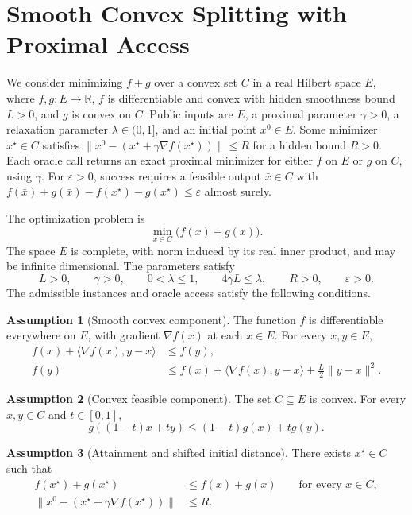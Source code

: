 \documentclass[10pt]{article}
\theoremstyle{definition}
\newtheorem{assumption}{Assumption}
\begin{document}
\section*{Smooth Convex Splitting with Proximal Access}
We consider minimizing $f+g$ over a convex set $C$ in a real Hilbert space $E$, where $f,g:E\to\mathbb{R}$, $f$ is differentiable and convex with hidden smoothness bound $L>0$, and $g$ is convex on $C$. Public inputs are $E$, a proximal parameter $\gamma>0$, a relaxation parameter $\lambda\in(0,1]$, and an initial point $x^0\in E$. Some minimizer $x^\star\in C$ satisfies $\|x^0-(x^\star+\gamma\nabla f(x^\star))\|\leq R$ for a hidden bound $R>0$. Each oracle call returns an exact proximal minimizer for either $f$ on $E$ or $g$ on $C$, using $\gamma$. For $\varepsilon>0$, success requires a feasible output $\bar{x}\in C$ with $f(\bar{x})+g(\bar{x})-f(x^\star)-g(x^\star)\leq\varepsilon$ almost surely.

The optimization problem is
\[
\min_{x\in C}\bigl(f(x)+g(x)\bigr).
\]
The space $E$ is complete, with norm induced by its real inner product, and may be infinite dimensional. The parameters satisfy
\[
L>0,\qquad \gamma>0,\qquad 0<\lambda\leq 1,
\qquad 4\gamma L\leq\lambda,\qquad R>0,\qquad\varepsilon>0.
\]
The admissible instances and oracle access satisfy the following conditions.

\begin{assumption}[Smooth convex component]
The function $f$ is differentiable everywhere on $E$, with gradient $\nabla f(x)$ at each $x\in E$. For every $x,y\in E$,
\[
\begin{aligned}
f(x)+\langle\nabla f(x),y-x\rangle
&\leq f(y),\\
f(y)&\leq f(x)+\langle\nabla f(x),y-x\rangle
+\frac{L}{2}\|y-x\|^2.
\end{aligned}
\]
\end{assumption}

\begin{assumption}[Convex feasible component]
The set $C\subseteq E$ is convex. For every $x,y\in C$ and $t\in[0,1]$,
\[
g((1-t)x+ty)\leq (1-t)g(x)+tg(y).
\]
\end{assumption}

\begin{assumption}[Attainment and shifted initial distance]
There exists $x^\star\in C$ such that
\[
\begin{aligned}
f(x^\star)+g(x^\star)&\leq f(x)+g(x)
\qquad\text{for every }x\in C,\\
\|x^0-(x^\star+\gamma\nabla f(x^\star))\|&\leq R.
\end{aligned}
\]
\end{assumption}
\end{document}
